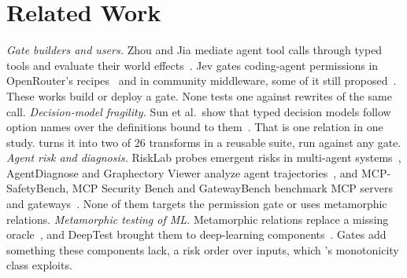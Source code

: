
\section{Related Work}\label{sec:related}

\emph{Gate builders and users.} Zhou and Jia mediate agent tool calls through
typed tools and evaluate their world effects~\cite{zhou2026introducing}. Jev
gates coding-agent permissions in OpenRouter's
recipes~\cite{openrouter2026autoapprove,openrouter2026gatetoolcalls} and in
community middleware, some of it still
proposed~\cite{lgy10272026jevshield,langchain2026typesafe}. These works build or
deploy a gate. None tests one against rewrites of the same call.
\emph{Decision-model fragility.} Sun et al.\ show that typed decision models
follow option names over the definitions bound to them~\cite{sun2026typesafe}.
That is one relation in one study. \tool{} turns it into two of 26 transforms
in a reusable suite, run against any gate.
\emph{Agent risk and diagnosis.} RiskLab probes emergent risks in multi-agent
systems~\cite{jiang2026risklab}, AgentDiagnose and Graphectory Viewer analyze
agent trajectories~\cite{ou2025agentdiagnose,jyu2026graphectory}, and
MCP-SafetyBench, MCP Security Bench and GatewayBench benchmark MCP servers and
gateways~\cite{zong2026mcpsafetybench,zhang2026mcp,zheng2026gatewaybench}. None
of them targets the permission gate or uses metamorphic relations.
\emph{Metamorphic testing of ML.} Metamorphic relations replace a missing
oracle~\cite{chen1998metamorphic,segura2016survey,chen2018metamorphic}, and
DeepTest brought them to deep-learning components~\cite{tian2018deeptest}.
Gates add something these components lack, a risk order over inputs, which
\tool{}'s monotonicity class exploits.
